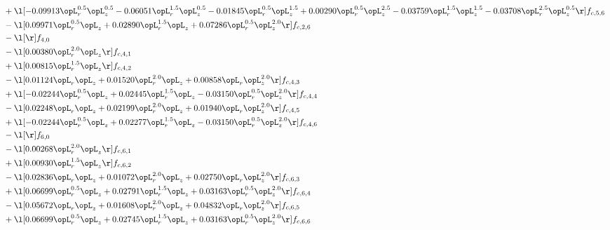 \begin{alignat}{2}
& + \l[  -0.09913 \opL_r^{0.5} \opL_z^{0.5}   -0.06051 \opL_r^{1.5} \opL_z^{0.5}   -0.01845 \opL_r^{0.5} \opL_z^{1.5} +  0.00290 \opL_r^{0.5} \opL_z^{2.5}   -0.03759 \opL_r^{1.5} \opL_z^{1.5}   -0.03708 \opL_r^{2.5} \opL_z^{0.5}  \r] f_{c,5,6} \nonumber \\ 
& - \l[  0.09971 \opL_r^{0.5} \opL_z +  0.02890 \opL_r^{1.5} \opL_z +  0.07286 \opL_r^{0.5} \opL_z^{2.0}  \r] f_{c,2,6} \nonumber \\ 
& - \l[  \r] f_{4,0} \nonumber \\ 
& - \l[  0.00380 \opL_r^{2.0} \opL_z  \r] f_{c,4,1} \nonumber \\ 
& + \l[  0.00815 \opL_r^{1.5} \opL_z  \r] f_{c,4,2} \nonumber \\ 
& - \l[  0.01124 \opL_r \opL_z +  0.01520 \opL_r^{2.0} \opL_z +  0.00858 \opL_r \opL_z^{2.0}  \r] f_{c,4,3} \nonumber \\ 
& + \l[  -0.02244 \opL_r^{0.5} \opL_z +  0.02445 \opL_r^{1.5} \opL_z   -0.03150 \opL_r^{0.5} \opL_z^{2.0}  \r] f_{c,4,4} \nonumber \\ 
& - \l[  0.02248 \opL_r \opL_z +  0.02199 \opL_r^{2.0} \opL_z +  0.01940 \opL_r \opL_z^{2.0}  \r] f_{c,4,5} \nonumber \\ 
& + \l[  -0.02244 \opL_r^{0.5} \opL_z +  0.02277 \opL_r^{1.5} \opL_z   -0.03150 \opL_r^{0.5} \opL_z^{2.0}  \r] f_{c,4,6} \nonumber \\ 
& - \l[  \r] f_{6,0} \nonumber \\ 
& - \l[  0.00268 \opL_r^{2.0} \opL_z  \r] f_{c,6,1} \nonumber \\ 
& + \l[  0.00930 \opL_r^{1.5} \opL_z  \r] f_{c,6,2} \nonumber \\ 
& - \l[  0.02836 \opL_r \opL_z +  0.01072 \opL_r^{2.0} \opL_z +  0.02750 \opL_r \opL_z^{2.0}  \r] f_{c,6,3} \nonumber \\ 
& + \l[  0.06699 \opL_r^{0.5} \opL_z +  0.02791 \opL_r^{1.5} \opL_z +  0.03163 \opL_r^{0.5} \opL_z^{2.0}  \r] f_{c,6,4} \nonumber \\ 
& - \l[  0.05672 \opL_r \opL_z +  0.01608 \opL_r^{2.0} \opL_z +  0.04832 \opL_r \opL_z^{2.0}  \r] f_{c,6,5} \nonumber \\ 
& + \l[  0.06699 \opL_r^{0.5} \opL_z +  0.02745 \opL_r^{1.5} \opL_z +  0.03163 \opL_r^{0.5} \opL_z^{2.0}  \r] f_{c,6,6} \nonumber \\ 
\end{alignat} 


